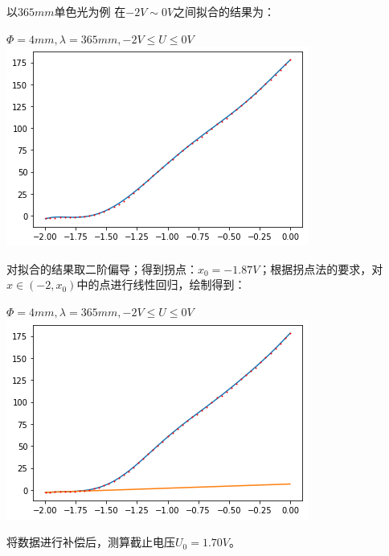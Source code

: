 \documentclass[a4paper]{ltxdoc}
\newenvironment{Figure}
  {\par\medskip\noindent\minipage{\linewidth}}
  {\endminipage\par\medskip}
\begin{document}
\begin{multicols}{2}
\begin{itemize}
              以$365 mm$单色光为例
              在$-2V \sim 0 V$之间拟合的结果为：
              \begin{Figure}
                  \centering
                  $\Phi = 4mm, \lambda = 365mm, -2V\leq U\leq 0V$
                  \includegraphics[width=\linewidth]{10.png}
              \end{Figure}

              对拟合的结果取二阶偏导；得到拐点：$x_0=-1.87V$；根据拐点法的要求，对$x \in (-2,x_0)$中的点进行线性回归，绘制得到：
              \begin{Figure}
                  \centering
                  $\Phi = 4mm, \lambda = 365mm, -2V\leq U\leq 0V$
                  \includegraphics[width=\linewidth]{11.png}
              \end{Figure}

              将数据进行补偿后，测算截止电压$U_0 = 1.70V$。


\end{itemize}
\end{multicols}
\end{document}
